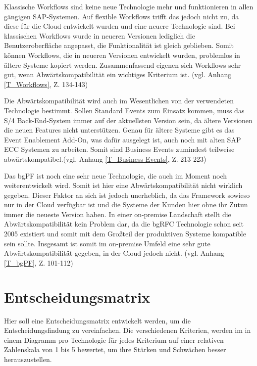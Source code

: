 Klassische Workflows sind keine neue Technologie mehr und funktionieren in allen gängigen SAP-Systemen. Auf flexible Workflows trifft das jedoch nicht zu, da diese für die Cloud entwickelt wurden und eine neuere Technologie sind. Bei klassischen Workflows wurde in neueren Versionen lediglich die Benutzeroberfläche angepasst, die Funktionalität ist gleich geblieben. Somit können Workflows, die in neueren Versionen entwickelt wurden, problemlos in ältere Systeme kopiert werden. Zusammenfassend eigenen sich Workflows sehr gut, wenn Abwärtskompatibilität ein wichtiges Kriterium ist. (vgl. Anhang \ref{T_Workflows}, Z. 134-143)

Die Abwärtskompatibilität wird auch im Wesentlichen von der verwendeten Technologie bestimmt. Sollen Standard Events zum Einsatz kommen, muss das S/4 Back-End-System immer auf der aktuellsten Version sein, da ältere Versionen die neuen Features nicht unterstützen. Genau für ältere Systeme gibt es das Event Enablement Add-On, was dafür ausgelegt ist, auch noch mit alten SAP ECC Systemen zu arbeiten. Somit sind Business Events zumindest teilweise abwärtskompatibel.(vgl. Anhang \ref{T_Business-Events}, Z. 213-223)

Das bgPF ist noch eine sehr neue Technologie, die auch im Moment noch weiterentwickelt wird. Somit ist hier eine Abwärtskompatibilität nicht wirklich gegeben. Dieser Faktor an sich ist jedoch unerheblich, da das Framework sowieso nur in der Cloud verfügbar ist und die Systeme der Kunden hier ohne ihr Zutun immer die neueste Version haben. In einer on-premise Landschaft stellt die Abwärtskompatibilität kein Problem dar, da die bgRFC Technologie schon seit 2005 existiert und somit mit dem Gro{\ss}teil der produktiven Systeme kompatible sein sollte. Insgesamt ist somit im on-premise Umfeld eine sehr gute Abwärtskompatibilität gegeben, in der Cloud jedoch nicht. (vgl. Anhang \ref{T_bgPF}, Z. 101-112)

\section{Entscheidungsmatrix}

Hier soll eine Entscheidungsmatrix entwickelt werden, um die Entscheidungsfindung zu vereinfachen. Die verschiedenen Kriterien, werden im in einem Diagramm pro Technologie für jedes Kriterium auf einer relativen Zahlenskala von 1 bis 5 bewertet, um ihre Stärken und Schwächen besser herauszustellen.

